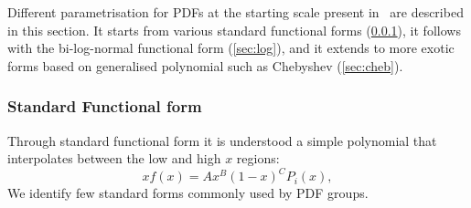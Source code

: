 
\label{sec:pdfparam}
Different parametrisation for PDFs at the starting scale present in \fitter\ are described in this section.
It starts from various standard functional forms (\ref{sec:stdform}), it follows with the bi-log-normal functional form (\ref{sec:log}), and it extends to more exotic forms based on generalised polynomial such as Chebyshev (\ref{sec:cheb}).

\subsubsection{Standard Functional form}
\label{sec:stdform}
Through standard functional form it is understood a simple polynomial 
that interpolates between the low and high $x$ regions:
\begin{equation}
 xf(x) = A x^{B} (1-x)^{C} P_i(x),
\label{eqn:pdf_std}
\end{equation}
We identify few standard forms commonly used by PDF groups.

